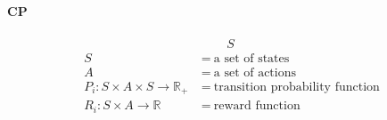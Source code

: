         \paragraph{CP}
            \begin{align}
                S\
            \end{align}
            \begin{align*}
                S\ &\ =\ \text{a set of states}                 \\
                A\ &\ =\ \text{a set of actions}                \\
                P_i : S \times A \times S  \rightarrow \mathbb{R}_+ &\ =\ \text{transition probability function} \\
                R_i : S \times A \rightarrow \mathbb{R}\ &\ =\ \text{reward function}
            \end{align*}


